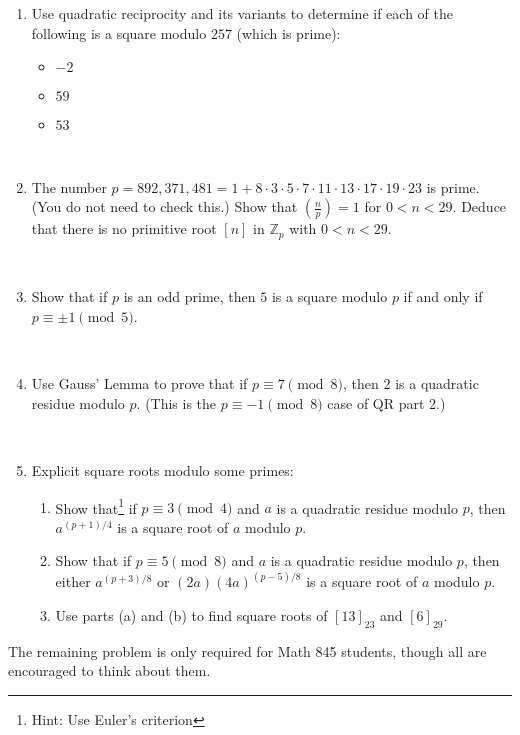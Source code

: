 \documentclass{amsart}
\def\Z{\mathbb Z}
\begin{document}
\begin{enumerate}

\item Use quadratic reciprocity and its variants to determine if each of the following is a square modulo $257$ (which is prime):
\begin{itemize}
\item $-2$
\item $59$
\item $53$
\end{itemize}


\

\item The number $p=892,371,481=1+8\cdot 3\cdot 5\cdot 7 \cdot 11 \cdot 13 \cdot 17 \cdot 19 \cdot 23$ is prime. (You do not need to check this.) Show that $\left(\frac{n}{p}\right) = 1$ for $0< n < 29$. Deduce that there is no primitive root $[n]$ in $\Z_p$ with $0<n<29$.

\


\item Show that if $p$ is an odd prime, then $5$ is a square modulo $p$ if and only if $p\equiv \pm 1 \pmod{5}$.

\

\item Use Gauss' Lemma to prove that if $p\equiv 7 \pmod 8$, then $2$ is a quadratic residue modulo $p$. (This is the $p\equiv -1\pmod 8$ case of QR part 2.)

\

\item Explicit square roots modulo some primes:
\begin{enumerate}
\item Show that\footnote{Hint: Use Euler's criterion} if $p\equiv 3 \pmod{4}$ and $a$ is a quadratic residue modulo $p$, then $a^{(p+1)/4}$ is a square root of $a$ modulo $p$.
\item Show that if $p\equiv 5 \pmod{8}$ and $a$ is a quadratic residue modulo $p$, then either $a^{(p+3)/8}$ or $(2a) (4a)^{(p-5)/8}$ is a square root of $a$ modulo $p$.
\item Use parts (a) and (b) to find square roots of $[13]_{23}$ and $[6]_{29}$.
\end{enumerate}


\end{enumerate}

\noindent  \hrulefill

\noindent The remaining problem is only required for Math 845 students, though all are encouraged to think about them.
\end{document}
